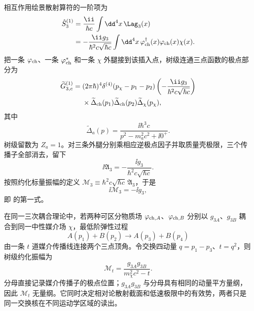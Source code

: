 \begin{exbox}
相互作用绘景散射算符的一阶项为
\begin{align*}
\hat S_3^{(1)}
&=\frac{\ii}{\hbar c}\int\dd^4 x\,\Lag_3(x)\\
&=-\frac{\ii g_3}{\hbar^2c\sqrt{\hbar c}}
\int\dd^4 x\,
\varphi_{\rm ch}^\dagger(x)\varphi_{\rm ch}(x)\chi(x).
\end{align*}
把一条 $\varphi_{\rm ch}$、一条 $\varphi_{\rm ch}^\ast$ 和一条 $\chi$ 外腿接到该插入点，树级连通三点函数的极点部分为
\begin{align*}
\widetilde G_{3,c}^{(1)}
={}&(2\pi\hbar)^4\delta^{(4)}(p_\chi-p_1-p_2)
\left(-\frac{\ii g_3}{\hbar^2c\sqrt{\hbar c}}\right)\\
&\times
\widetilde\Delta_{\rm ch}(p_1)
\widetilde\Delta_{\rm ch}(p_2)
\widetilde\Delta_\chi(p_\chi),
\end{align*}
其中
\begin{equation*}
\widetilde\Delta_a(p)
=\frac{\ii\hbar^3c}{p^2-m_a^2c^2+\ii0^+}.
\end{equation*}
树级留数为 $Z_a=1$。对三条外腿分别乘相应逆极点因子并取质量壳极限，三个传播子全部消去，留下
\begin{equation*}
\ii\mathfrak A_3
=-\frac{\ii g_3}{\hbar^2c\sqrt{\hbar c}}.
\end{equation*}
按照约化标量振幅的定义
$\mathcal M_3\equiv\hbar^2c\sqrt{\hbar c}\,\mathfrak A_3$，于是
\begin{equation*}
\ii\mathcal M_3=-\ii g_3,
\end{equation*}
即 的第一式。
\end{exbox}

在同一三次耦合理论中，若两种可区分物质场 $\varphi_{{\rm ch},A}$、$\varphi_{{\rm ch},B}$ 分别以 $g_{3A}$、$g_{3B}$ 耦合到同一中性媒介场 $\chi$，最低阶弹性过程
\[
A(p_1)+B(p_2)\to A(p_3)+B(p_4)
\]
由一条 $t$ 道媒介传播线连接两个三点顶角。令交换四动量 $q=p_1-p_3$、$t=q^2$，则树级约化振幅为
\begin{equation}
{
\mathcal M_t
=\frac{g_{3A}g_{3B}}{m_\chi^2c^2-t}.}
\label{eq:scalar-exchange-mphi-r15}
\end{equation}
分母直接记录媒介传播子的极点位置；$g_{3A}g_{3B}$ 与分母具有相同的动量平方量纲，因此 $\mathcal M_t$ 无量纲。它同时决定相对论散射截面和低速极限中的有效势，两者只是同一交换核在不同运动学区域的读出。

